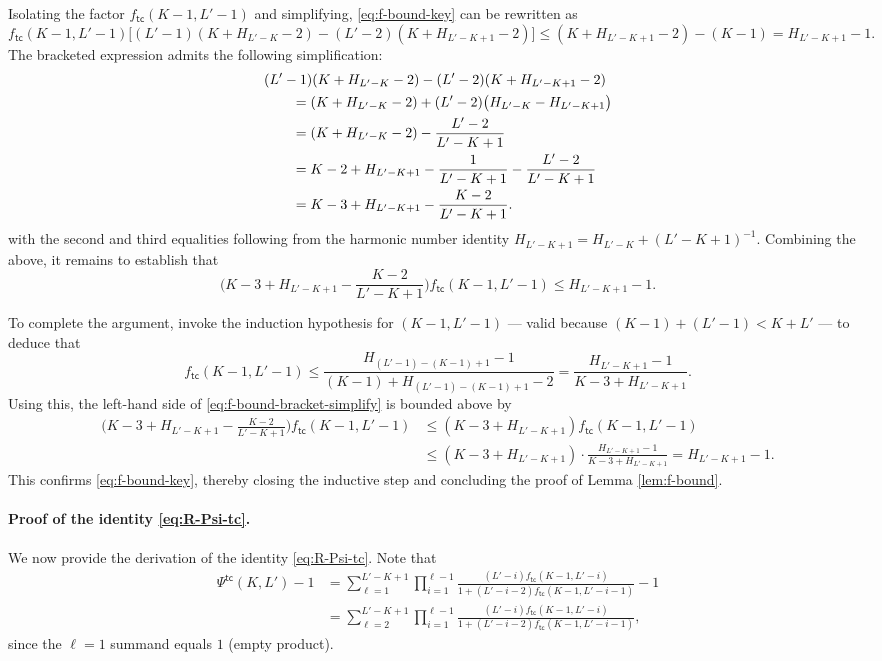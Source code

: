 \documentclass[english]{article}
\newcommand{\tc}{\mathsf{tc}}
\begin{document}
Isolating the factor $f_\tc(K - 1, L' - 1)$ and simplifying, \eqref{eq:f-bound-key} can be rewritten as
\[
    f_\tc(K - 1, L' - 1) \big[ (L'-1)(K + H_{L'-K} - 2) - (L'-2)(K + H_{L'-K+1} - 2) \big] \leq (K + H_{L'-K+1} - 2) - (K - 1) = H_{L'-K+1} - 1.
\]
The bracketed expression admits the following simplification:
\begin{align*}
    &(L'-1)(K + H_{L'-K} - 2) - (L'-2)(K + H_{L'-K+1} - 2) \notag\\
    &\qquad = (K + H_{L'-K} - 2) + (L'-2)\big(H_{L'-K} - H_{L'-K+1}\big) \notag\\
    &\qquad = (K + H_{L'-K} - 2) - \frac{L'-2}{L'-K+1} \notag\\
    &\qquad = K - 2 + H_{L'-K+1} - \frac{1}{L'-K+1} - \frac{L'-2}{L'-K+1} \notag\\
    &\qquad = K - 3 + H_{L'-K+1} - \frac{K - 2}{L' - K + 1}.
\end{align*}
with the second and third equalities following from the harmonic number identity $H_{L'-K+1} = H_{L'-K} + (L'-K+1)^{-1}$.
Combining the above, it remains to establish that
\begin{equation}\label{eq:f-bound-bracket-simplify}
    \Big(K - 3 + H_{L'-K+1} - \frac{K - 2}{L' - K + 1}\Big) f_\tc(K - 1, L' - 1) \leq H_{L'-K+1} - 1.
\end{equation}

To complete the argument, invoke the induction hypothesis for $(K-1, L'-1)$ --- valid because $(K-1) + (L'-1) < K + L'$ --- to deduce that
\[
    f_\tc(K - 1, L' - 1) \leq \frac{H_{(L'-1)-(K-1)+1} - 1}{(K-1) + H_{(L'-1)-(K-1)+1} - 2} = \frac{H_{L'-K+1} - 1}{K - 3 + H_{L'-K+1}}.
\]
Using this, the left-hand side of \eqref{eq:f-bound-bracket-simplify} is bounded above by
\begin{align*}
    \Big(K - 3 + H_{L'-K+1} - \frac{K - 2}{L' - K + 1}\Big)  f_\tc(K - 1, L' - 1) &\leq (K - 3 + H_{L'-K+1} )  f_\tc(K - 1, L' - 1) \\
    &\leq (K - 3 + H_{L'-K+1}) \cdot \frac{H_{L'-K+1} - 1}{K - 3 + H_{L'-K+1}} = H_{L'-K+1} - 1.
\end{align*}
This confirms \eqref{eq:f-bound-key}, thereby closing the inductive step and concluding the proof of Lemma \ref{lem:f-bound}.

\paragraph{Proof of the identity \eqref{eq:R-Psi-tc}.}
We now provide the derivation of the identity \eqref{eq:R-Psi-tc}. Note that
\begin{align*}
\Psi^{\tc}(K, L') - 1 &= \sum_{\ell = 1}^{L'-K+1} \prod_{i=1}^{\ell - 1} \frac{(L'-i)f_\tc(K-1, L' - i)}{1 + (L'-i-2)f_\tc(K-1, L' - i - 1)} - 1 \\ 
& =   \sum_{\ell=2}^{L'-K+1} \prod_{i=1}^{\ell - 1} \frac{(L'-i)f_\tc(K-1, L' - i)}{1 + (L'-i-2)f_\tc(K-1, L' - i - 1)},
\end{align*} 
since the $\ell = 1$ summand equals $1$ (empty product).
\end{document}
